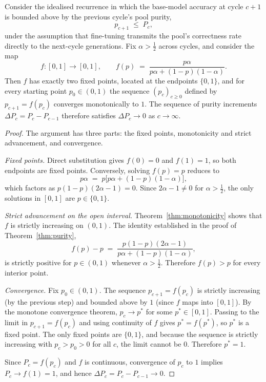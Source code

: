 \begin{theorem}
\label{thm:convergence}
Consider the idealised recurrence in which the base-model accuracy at cycle $c + 1$ is bounded above by the previous cycle's pool purity,
\[
    p_{c+1} \;\le\; P_c,
\]
under the assumption that fine-tuning transmits the pool's correctness rate directly to the next-cycle generations. Fix $\alpha > \tfrac{1}{2}$ across cycles, and consider the map
\[
    f : [0, 1] \to [0, 1], \qquad f(p) \;=\; \frac{p\alpha}{p\alpha + (1 - p)(1 - \alpha)}.
\]
Then $f$ has exactly two fixed points, located at the endpoints $\{0, 1\}$, and for every starting point $p_0 \in (0, 1)$ the sequence $(p_c)_{c \ge 0}$ defined by $p_{c+1} = f(p_c)$ converges monotonically to $1$. The sequence of purity increments $\Delta P_c = P_c - P_{c-1}$ therefore satisfies $\Delta P_c \to 0$ as $c \to \infty$.
\end{theorem}

\begin{proof}
The argument has three parts: the fixed points, monotonicity and strict advancement, and convergence.

\emph{Fixed points.} Direct substitution gives $f(0) = 0$ and $f(1) = 1$, so both endpoints are fixed points. Conversely, solving $f(p) = p$ reduces to
\[
    p\alpha \;=\; p\bigl[p\alpha + (1-p)(1-\alpha)\bigr],
\]
which factors as $p(1-p)(2\alpha - 1) = 0$. Since $2\alpha - 1 \ne 0$ for $\alpha > \tfrac{1}{2}$, the only solutions in $[0, 1]$ are $p \in \{0, 1\}$.

\emph{Strict advancement on the open interval.} Theorem~\ref{thm:monotonicity} shows that $f$ is strictly increasing on $(0, 1)$. The identity established in the proof of Theorem~\ref{thm:purity},
\[
    f(p) - p \;=\; \frac{p(1-p)(2\alpha - 1)}{p\alpha + (1-p)(1-\alpha)},
\]
is strictly positive for $p \in (0, 1)$ whenever $\alpha > \tfrac{1}{2}$. Therefore $f(p) > p$ for every interior point.

\emph{Convergence.} Fix $p_0 \in (0, 1)$. The sequence $p_{c+1} = f(p_c)$ is strictly increasing (by the previous step) and bounded above by $1$ (since $f$ maps into $[0, 1]$). By the monotone convergence theorem, $p_c \to p^*$ for some $p^* \in [0, 1]$. Passing to the limit in $p_{c+1} = f(p_c)$ and using continuity of $f$ gives $p^* = f(p^*)$, so $p^*$ is a fixed point. The only fixed points are $\{0, 1\}$, and because the sequence is strictly increasing with $p_c > p_0 > 0$ for all $c$, the limit cannot be $0$. Therefore $p^* = 1$.

Since $P_c = f(p_c)$ and $f$ is continuous, convergence of $p_c$ to $1$ implies $P_c \to f(1) = 1$, and hence $\Delta P_c = P_c - P_{c-1} \to 0$.
\end{proof}


